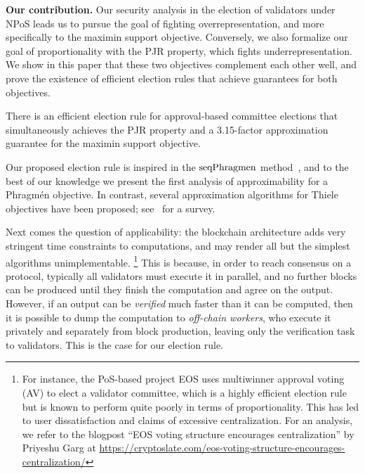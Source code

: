 \textbf{Our contribution.}
Our security analysis in the election of validators under NPoS leads us to pursue the goal of fighting overrepresentation, and more specifically to the maximin support objective.  
Conversely, we also formalize our goal of proportionality with the PJR property, which fights underrepresentation. 
We show in this paper that these two objectives complement each other well, and prove the existence of efficient election rules that achieve guarantees for both objectives. 

\begin{theorem}\label{thm:intro1}
There is an efficient election rule for approval-based committee elections that simultaneously achieves the PJR property and a 3.15-factor approximation guarantee for the maximin support objective.
\end{theorem}

Our proposed election rule is inspired in the $\operatorname{seqPhragmen}$ method~\cite{brill2017phragmen}, and to the best of our knowledge we present the first analysis of approximability for a Phragm\'{e}n objective. 
In contrast, several approximation algorithms for Thiele objectives have been proposed; see~\cite{lackner2020approval} for a survey. 

Next comes the question of applicability: the blockchain architecture adds very stringent time constraints to computations, and may render all but the simplest algorithms unimplementable.%
%
\footnote{For instance, the PoS-based project EOS uses multiwinner approval voting (AV) to elect a validator committee, which is a highly efficient election rule but is known to perform quite poorly in terms of proportionality. This has led to user dissatisfaction and claims of excessive centralization. 
For an analysis, we refer to the blogpost ``EOS voting structure encourages centralization'' by Priyeshu Garg at \url{https://cryptoslate.com/eos-voting-structure-encourages-centralization/}} %
% 
This is because, in order to reach consensus on a protocol, typically all validators must execute it in parallel, and no further blocks can be produced until they finish the computation and agree on the output. 
However, if an output can be \emph{verified} much faster than it can be computed, then it is possible to dump the computation to \emph{off-chain workers}, who execute it privately and separately from block production, leaving only the verification task to validators. This is the case for our election rule.

